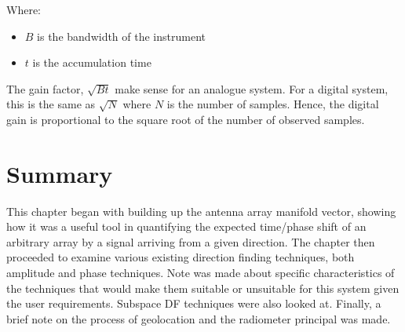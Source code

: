 Where:
\begin{itemize}
  \item \(B\) is the bandwidth of the instrument
  \item \(t\) is the accumulation time
\end{itemize}

The gain factor, \(\sqrt{Bt}\) make sense for an analogue system. For a digital system, this is the same as \(\sqrt{N}\) where \(N\) is the number of samples. Hence, the digital gain is proportional to the square root of the number of observed samples.

\section{Summary}
This chapter began with building up the antenna array manifold vector, showing how it was a useful tool in quantifying the expected time/phase shift of an arbitrary array by a signal arriving from a given direction. The chapter then proceeded to examine various existing direction finding techniques, both amplitude and phase techniques. Note was made about specific characteristics of the techniques that would make them suitable or unsuitable for this system given the user requirements. Subspace DF techniques were also looked at. Finally, a brief note on the process of geolocation and the radiometer principal was made.
